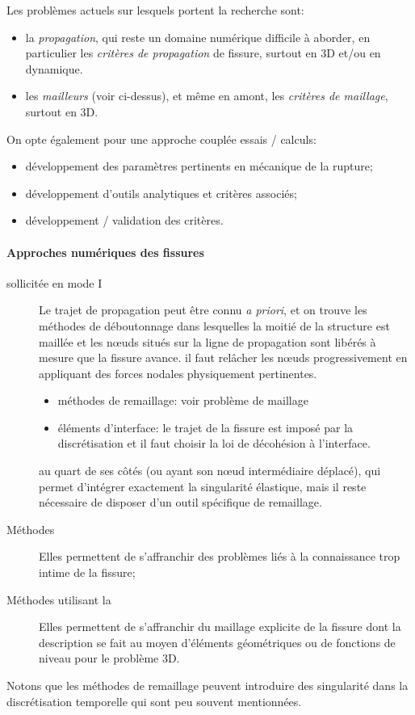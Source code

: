 \medskip
Les problèmes actuels sur lesquels portent la recherche sont:
\begin{itemize}
  \item la \emph{propagation}, qui reste un domaine numérique difficile à aborder, en 	particulier les \emph{critères de propagation} de fissure, surtout en 3D et/ou en dynamique.
  \item les \emph{mailleurs} (voir ci-dessus), et même en amont, les \emph{critères de maillage}, surtout en 3D.	
\end{itemize}
\medskipvm
On opte également pour une approche couplée essais / calculs:
\begin{itemize}
  \item développement des paramètres pertinents en mécanique de la rupture;
  \item développement d'outils analytiques et critères associés;
  \item développement / validation des critères.
\end{itemize}

\medskip
\paragraph{Approches numériques des fissures}
\begin{description}
  \item[ sollicitée en mode I]
	Le trajet de propagation peut être connu \emph{a priori}, et on trouve les
	méthodes de déboutonnage dans lesquelles la moitié de la structure est
	maillée et les nœuds situés sur la ligne de propagation sont libérés
	à mesure que la fissure avance.  il faut relâcher les nœuds
	progressivement en appliquant des forces nodales physiquement
	pertinentes.
  \item[]\mbox{}
\begin{itemize}
\item méthodes de remaillage:
	voir problème de maillage
  \item éléments d'interface:
	le trajet de la fissure est imposé par la discrétisation et il faut choisir
	la loi de décohésion à l'interface.
	\end{itemize}
  \item[]
	au quart de ses côtés (ou ayant son nœud intermédiaire déplacé), qui
	permet d'intégrer exactement la singularité élastique, mais il reste
	nécessaire de disposer d'un outil spécifique de remaillage.
  \item[Méthodes ] Elles permettent de s'affranchir
	des problèmes liés à la connaissance trop intime de la fissure;
  \item[Méthodes utilisant la ]
	Elles permettent de s'affranchir du maillage explicite de la fissure dont la
	description se fait au moyen d'éléments géométriques ou de fonctions
	de niveau pour le problème 3D.
\end{description}
Notons que les méthodes de remaillage peuvent introduire des singularité dans la discrétisation temporelle qui sont peu souvent mentionnées.



